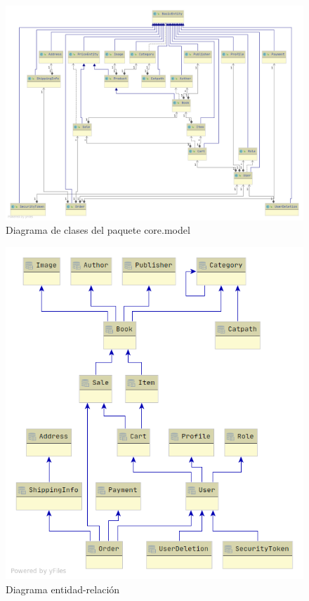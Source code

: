 \documentclass[a4paper]{article}
\begin{document}
    \begin{figure}[htb!]
    	\centering
    	\includegraphics[height=\textwidth,angle=90,origin=c]{package_model}
    	\caption{Diagrama de clases del paquete core.model}
    	\label{fig:package_model}
    \end{figure}

	\begin{figure}[htb!]
		\centering
		\includegraphics[width=\textwidth,keepaspectratio]{er_simple_diagram}
		\caption{Diagrama entidad-relación}
		\label{fig:er_simple_diagram}
	\end{figure}
\end{document}
